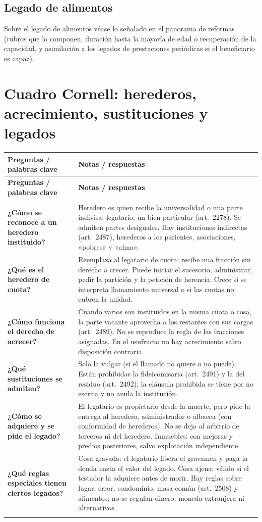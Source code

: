 \documentclass[12pt,oneside]{book}
\newenvironment{cornell}{%
    \begin{longtable}{>{\raggedright\arraybackslash}p{0.27\textwidth}
                      >{\raggedright\arraybackslash}p{0.66\textwidth}}
    \toprule
    \textbf{Preguntas / palabras clave} & \textbf{Notas / respuestas} \\
    \midrule
    \endfirsthead
    \toprule
    \textbf{Preguntas / palabras clave} & \textbf{Notas / respuestas} \\
    \midrule
    \endhead
    \midrule[0.3pt]
    \multicolumn{2}{r}{\footnotesize\textit{Continúa en la página siguiente}} \\
    \endfoot
    \endlastfoot
}{%
    \end{longtable}
}
\newcommand{\cornellrow}[2]{%
    \textbf{#1} & #2 \\
    \midrule[0.3pt]
}
\newcommand{\cornellsummary}[1]{%
    \midrule
    \multicolumn{2}{p{\dimexpr0.93\textwidth+2\tabcolsep\relax}}{%
        \textbf{Resumen:} #1} \\
    \bottomrule
}
\begin{document}
\subsection{Legado de alimentos}

Sobre el legado de alimentos véase lo señalado en el panorama de reformas (rubros que lo componen, duración hasta la mayoría de edad o recuperación de la capacidad, y asimilación a los legados de prestaciones periódicas si el beneficiario es capaz).

\section{Cuadro Cornell: herederos, acrecimiento, sustituciones y legados}

\begin{cornell}
\cornellrow{¿Cómo se reconoce a un heredero instituido?}{Heredero es quien recibe la universalidad o una parte indivisa; legatario, un bien particular (art.~2278). Se admiten partes desiguales. Hay instituciones indirectas (art.~2487), herederos a los parientes, asociaciones, «pobres» y «alma».}
\cornellrow{¿Qué es el heredero de cuota?}{Reemplaza al legatario de cuota: recibe una fracción sin derecho a crecer. Puede iniciar el sucesorio, administrar, pedir la partición y la petición de herencia. Crece si se interpreta llamamiento universal o si las cuotas no cubren la unidad.}
\cornellrow{¿Cómo funciona el derecho de acrecer?}{Cuando varios son instituidos en la misma cuota o cosa, la parte vacante aprovecha a los restantes con sus cargas (art.~2489). No se reproduce la regla de las fracciones asignadas. En el usufructo no hay acrecimiento salvo disposición contraria.}
\cornellrow{¿Qué sustituciones se admiten?}{Solo la vulgar (si el llamado no quiere o no puede). Están prohibidas la fideicomisaria (art.~2491) y la del residuo (art.~2492); la cláusula prohibida se tiene por no escrita y no anula la institución.}
\cornellrow{¿Cómo se adquiere y se pide el legado?}{El legatario es propietario desde la muerte, pero pide la entrega al heredero, administrador o albacea (con conformidad de herederos). No se deja al arbitrio de terceros ni del heredero. Inmuebles: con mejoras y predios posteriores, salvo explotación independiente.}
\cornellrow{¿Qué reglas especiales tienen ciertos legados?}{Cosa gravada: el legatario libera el gravamen y paga la deuda hasta el valor del legado. Cosa ajena: válido si el testador la adquiere antes de morir. Hay reglas sobre lugar, error, condominio, masa común (art.~2508) y alimentos; no se regulan dinero, moneda extranjera ni alternativos.}
\cornellsummary{El heredero recibe la universalidad o una parte indivisa y tiene derecho implícito a crecer; el heredero de cuota reemplaza al legatario de cuota y solo excepcionalmente acrece. El derecho de acrecer se regula en una sola norma (art.~2489). Solo se admite la sustitución vulgar. Los legados particulares se rigen por un régimen general (propiedad desde la muerte, pedido de entrega) y por reglas especiales: cosa gravada, cosa ajena, lugar, error, condominio y alimentos.}
\end{cornell}
\end{document}
